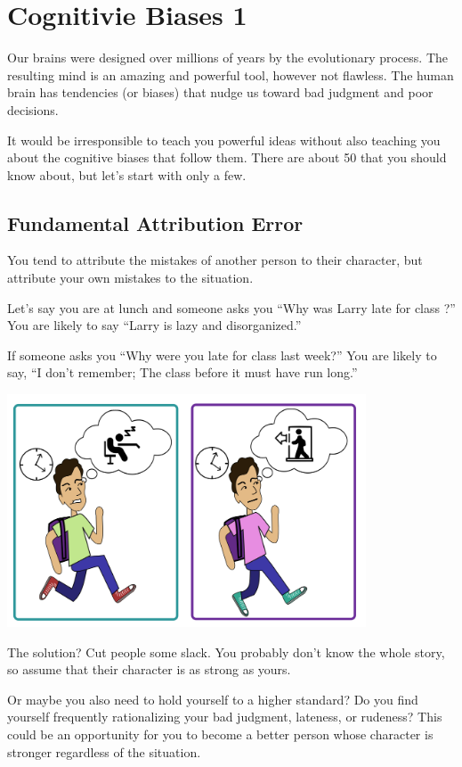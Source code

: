 \chapter{Cognitivie Biases 1}


Our brains were designed over millions of years by the evolutionary
process. The resulting mind is an amazing and powerful tool, however
not flawless. The human brain has tendencies (or biases) that nudge us
toward bad judgment and poor decisions.

It would be irresponsible to teach you powerful ideas without
also teaching you about the cognitive biases that follow them. There are about 50
that you should know about, but let's start with only a few.

\section{Fundamental Attribution Error}

You tend to attribute
the mistakes of another person to their character, but attribute your
own mistakes to the situation.

Let's say you are at lunch and someone asks you ``Why was Larry late
for class ?''  You are likely to say ``Larry is lazy
and disorganized.''

If someone asks you ``Why were you late for class last week?''  You
are likely to say, ``I don't remember; The class before it must have
run long.''

\includegraphics[width=0.8\textwidth]{bias_late.png}

The solution? Cut people some slack. You probably don't know the whole
story, so assume that their character is as strong as yours.

Or maybe you also need to hold yourself to a higher standard? Do you find
yourself frequently rationalizing your bad judgment, lateness, or
rudeness?  This could be an opportunity for you to become a better
person whose character is stronger regardless of the situation.

